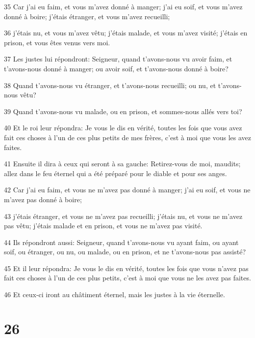 \par 35 Car j'ai eu faim, et vous m'avez donné à manger; j'ai eu soif, et vous m'avez donné à boire; j'étais étranger, et vous m'avez recueilli;
\par 36 j'étais nu, et vous m'avez vêtu; j'étais malade, et vous m'avez visité; j'étais en prison, et vous êtes venus vers moi.
\par 37 Les justes lui répondront: Seigneur, quand t'avons-nous vu avoir faim, et t'avons-nous donné à manger; ou avoir soif, et t'avons-nous donné à boire?
\par 38 Quand t'avons-nous vu étranger, et t'avons-nous recueilli; ou nu, et t'avons-nous vêtu?
\par 39 Quand t'avons-nous vu malade, ou en prison, et sommes-nous allés vers toi?
\par 40 Et le roi leur répondra: Je vous le dis en vérité, toutes les fois que vous avez fait ces choses à l'un de ces plus petits de mes frères, c'est à moi que vous les avez faites.
\par 41 Ensuite il dira à ceux qui seront à sa gauche: Retirez-vous de moi, maudits; allez dans le feu éternel qui a été préparé pour le diable et pour ses anges.
\par 42 Car j'ai eu faim, et vous ne m'avez pas donné à manger; j'ai eu soif, et vous ne m'avez pas donné à boire;
\par 43 j'étais étranger, et vous ne m'avez pas recueilli; j'étais nu, et vous ne m'avez pas vêtu; j'étais malade et en prison, et vous ne m'avez pas visité.
\par 44 Ils répondront aussi: Seigneur, quand t'avons-nous vu ayant faim, ou ayant soif, ou étranger, ou nu, ou malade, ou en prison, et ne t'avons-nous pas assisté?
\par 45 Et il leur répondra: Je vous le dis en vérité, toutes les fois que vous n'avez pas fait ces choses à l'un de ces plus petits, c'est à moi que vous ne les avez pas faites.
\par 46 Et ceux-ci iront au châtiment éternel, mais les justes à la vie éternelle.

\chapter{26}


